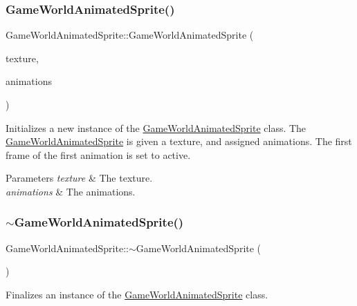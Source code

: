 \subsubsection{\texorpdfstring{Game\+World\+Animated\+Sprite()}{GameWorldAnimatedSprite()}\hspace{0.1cm}{\footnotesize\ttfamily [3/3]}}
{\footnotesize\ttfamily Game\+World\+Animated\+Sprite\+::\+Game\+World\+Animated\+Sprite (\begin{DoxyParamCaption}\item[{const sf\+::\+Texture \&}]{texture,  }\item[{\hyperlink{class_animation_set}{Animation\+Set} $\ast$}]{animations }\end{DoxyParamCaption})}



Initializes a new instance of the \hyperlink{class_game_world_animated_sprite}{Game\+World\+Animated\+Sprite} class. The \hyperlink{class_game_world_animated_sprite}{Game\+World\+Animated\+Sprite} is given a texture, and assigned animations. The first frame of the first animation is set to active. 


\begin{DoxyParams}{Parameters}
{\em texture} & The texture.\\
\hline
{\em animations} & The animations.\\
\hline
\end{DoxyParams}
\mbox{\label{class_game_world_animated_sprite_a33868dd12e9d7496e47760a765b55d87}} 
\subsubsection{\texorpdfstring{$\sim$\+Game\+World\+Animated\+Sprite()}{~GameWorldAnimatedSprite()}}
{\footnotesize\ttfamily Game\+World\+Animated\+Sprite\+::$\sim$\+Game\+World\+Animated\+Sprite (\begin{DoxyParamCaption}{ }\end{DoxyParamCaption})\hspace{0.3cm}{\ttfamily [virtual]}}



Finalizes an instance of the \hyperlink{class_game_world_animated_sprite}{Game\+World\+Animated\+Sprite} class. 



